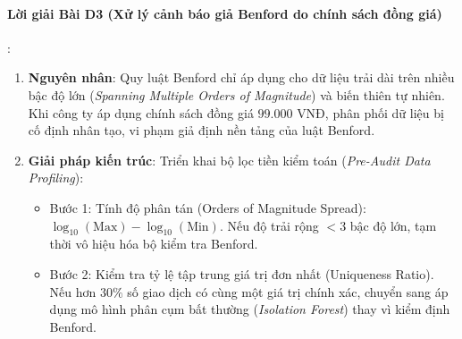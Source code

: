 \paragraph{Lời giải Bài D3 (Xử lý cảnh báo giả Benford do chính sách đồng giá)}:
\begin{enumerate}
  \item \textbf{Nguyên nhân}: Quy luật Benford chỉ áp dụng cho dữ liệu trải dài trên nhiều bậc độ lớn (\textit{Spanning Multiple Orders of Magnitude}) và biến thiên tự nhiên. Khi công ty áp dụng chính sách đồng giá $99.000\text{ VNĐ}$, phân phối dữ liệu bị cố định nhân tạo, vi phạm giả định nền tảng của luật Benford.
  \item \textbf{Giải pháp kiến trúc}:
  Triển khai bộ lọc tiền kiểm toán (\textit{Pre-Audit Data Profiling}):
  \begin{itemize}
    \item Bước 1: Tính độ phân tán (Orders of Magnitude Spread): $\log_{10}(\text{Max}) - \log_{10}(\text{Min})$. Nếu độ trải rộng $< 3$ bậc độ lớn, tạm thời vô hiệu hóa bộ kiểm tra Benford.
    \item Bước 2: Kiểm tra tỷ lệ tập trung giá trị đơn nhất (Uniqueness Ratio). Nếu hơn $30\%$ số giao dịch có cùng một giá trị chính xác, chuyển sang áp dụng mô hình phân cụm bất thường (\textit{Isolation Forest}) thay vì kiểm định Benford.
  \end{itemize}
\end{enumerate}

